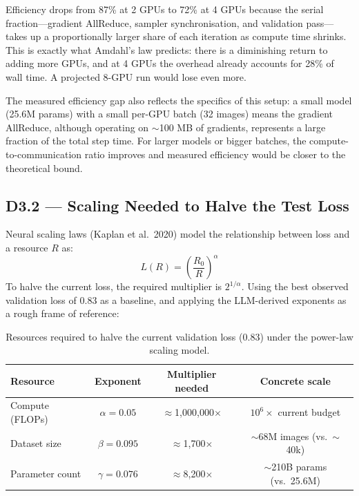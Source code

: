 Efficiency drops from 87\% at 2 GPUs to 72\% at 4 GPUs because the serial
fraction—gradient AllReduce, sampler synchronisation, and validation
pass—takes up a proportionally larger share of each iteration as compute
time shrinks. This is exactly what Amdahl's law predicts: there is a
diminishing return to adding more GPUs, and at 4 GPUs the overhead already
accounts for 28\% of wall time. A projected 8-GPU run would lose even more.

The measured efficiency gap also reflects the specifics of this setup: a
small model (25.6M params) with a small per-GPU batch (32 images) means
the gradient AllReduce, although operating on $\sim$100 MB of gradients,
represents a large fraction of the total step time. For larger models or
bigger batches, the compute-to-communication ratio improves and measured
efficiency would be closer to the theoretical bound.

\subsection{D3.2 — Scaling Needed to Halve the Test Loss}

Neural scaling laws (Kaplan et al.\ 2020) model the relationship between
loss and a resource $R$ as:
\[
L(R) = \left(\frac{R_0}{R}\right)^{\alpha}
\]
To halve the current loss, the required multiplier is $2^{1/\alpha}$.
Using the best observed validation loss of 0.83 as a baseline, and
applying the LLM-derived exponents as a rough frame of reference:

\begin{table}[h]
\centering
\caption{Resources required to halve the current validation loss (0.83)
  under the power-law scaling model.}
\label{tab:scaling_laws}
\begin{tabular}{lccc}
\toprule
\textbf{Resource} & \textbf{Exponent} & \textbf{Multiplier needed}
  & \textbf{Concrete scale} \\
\midrule
Compute (FLOPs) & $\alpha = 0.05$ & $\approx$1{,}000{,}000$\times$
  & $10^6\times$ current budget \\
Dataset size    & $\beta  = 0.095$ & $\approx$1{,}700$\times$
  & $\sim$68M images (vs.\ $\sim$40k) \\
Parameter count & $\gamma = 0.076$ & $\approx$8{,}200$\times$
  & $\sim$210B params (vs.\ 25.6M) \\
\bottomrule
\end{tabular}
\end{table}

